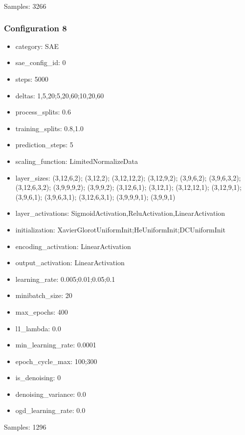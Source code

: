 \documentclass[a4paper,11pt,oneside]{article}
\theoremstyle{plain}
\theoremstyle{definition}
\begin{document}
	Samples: 3266
	
	\subsubsection{Configuration 8}\label{config8}
	\begin{itemize}
		\item category: SAE
		\item sae\_config\_id: 0
		\item steps: 5000
		\item deltas: 1,5,20;5,20,60;10,20,60
		\item process\_splits: 0.6
		\item training\_splits: 0.8,1.0
		\item prediction\_steps: 5
		\item scaling\_function: LimitedNormalizeData
		\item layer\_sizes: (3,12,6,2); (3,12,2); (3,12,12,2); (3,12,9,2); (3,9,6,2); (3,9,6,3,2); (3,12,6,3,2); (3,9,9,9,2); (3,9,9,2); (3,12,6,1); (3,12,1); (3,12,12,1); (3,12,9,1); (3,9,6,1); (3,9,6,3,1); (3,12,6,3,1); (3,9,9,9,1); (3,9,9,1)
		\item layer\_activations: SigmoidActivation,ReluActivation,LinearActivation
		\item initialization: XavierGlorotUniformInit;HeUniformInit;DCUniformInit
		\item encoding\_activation: LinearActivation
		\item output\_activation: LinearActivation
		\item learning\_rate: 0.005;0.01;0.05;0.1
		\item minibatch\_size: 20
		\item max\_epochs: 400
		\item l1\_lambda: 0.0
		\item min\_learning\_rate: 0.0001
		\item epoch\_cycle\_max: 100;300
		\item is\_denoising: 0
		\item denoising\_variance: 0.0
		\item ogd\_learning\_rate: 0.0
	\end{itemize}
	
	Samples: 1296
	
\end{document}
